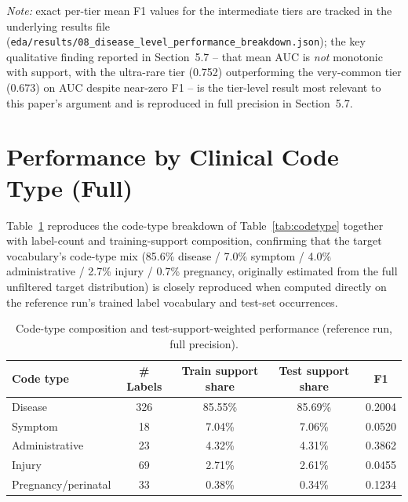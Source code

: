 \documentclass[11pt]{article}
\begin{document}
\emph{Note:} exact per-tier mean F1 values for the intermediate tiers are
tracked in the underlying results file
(\texttt{eda/results/08\_disease\_level\_performance\_breakdown.json}); the
key qualitative finding reported in Section~5.7 -- that mean AUC is
\emph{not} monotonic with support, with the ultra-rare tier (0.752)
outperforming the very-common tier (0.673) on AUC despite near-zero F1 -- is
the tier-level result most relevant to this paper's argument and is
reproduced in full precision in Section~5.7.

\section{Performance by Clinical Code Type (Full)}

Table~\ref{tab:appendixC} reproduces the code-type breakdown of
Table~\ref{tab:codetype} together with label-count and training-support
composition, confirming that the target vocabulary's code-type mix (85.6\%
disease / 7.0\% symptom / 4.0\% administrative / 2.7\% injury / 0.7\%
pregnancy, originally estimated from the full unfiltered target distribution)
is closely reproduced when computed directly on the reference run's trained
label vocabulary and test-set occurrences.

\begin{table}[h]
\centering
\caption{Code-type composition and test-support-weighted performance
(reference run, full precision).}
\label{tab:appendixC}
\begin{tabular}{lcccc}
\toprule
Code type & \# Labels & Train support share & Test support share & F1 \\
\midrule
Disease & 326 & 85.55\% & 85.69\% & 0.2004 \\
Symptom & 18 & 7.04\% & 7.06\% & 0.0520 \\
Administrative & 23 & 4.32\% & 4.31\% & 0.3862 \\
Injury & 69 & 2.71\% & 2.61\% & 0.0455 \\
Pregnancy/perinatal & 33 & 0.38\% & 0.34\% & 0.1234 \\
\bottomrule
\end{tabular}
\end{table}
\end{document}
